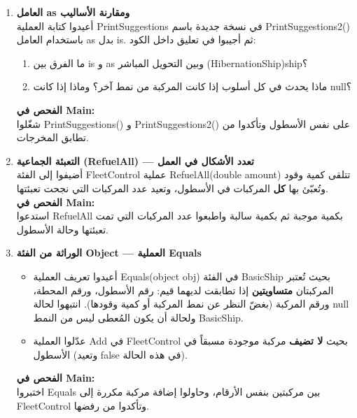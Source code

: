 \documentclass[14pt]{extarticle}
\begin{document}
\begin{enumerate}[resume, label=\textbf{تمرين \arabic*:}, wide=0pt, leftmargin=*, itemsep=2.2em]
    \item \textbf{العامل \textenglish{as} ومقارنة الأساليب} \\
    أعيدوا كتابة العملية \textenglish{PrintSuggestions} في نسخة جديدة باسم \textenglish{PrintSuggestions2()} باستخدام العامل \textenglish{as} بدل \textenglish{is}. ثم أجيبوا في تعليق داخل الكود:
    \begin{enumerate}[label=\textbf{\arabic*.}]
        \item ما الفرق بين \textenglish{is} و \textenglish{as} وبين التحويل المباشر \textenglish{(HibernationShip)ship}؟
        \item ماذا يحدث في كل أسلوب إذا كانت المركبة من نمط آخر؟ وماذا إذا كانت \textenglish{null}؟
    \end{enumerate}
    \textbf{الفحص في \textenglish{Main}:} \\
    شغّلوا \textenglish{PrintSuggestions()} و \textenglish{PrintSuggestions2()} على نفس الأسطول وتأكدوا من تطابق المخرجات.

    \item \textbf{التعبئة الجماعية (\textenglish{RefuelAll}) — تعدد الأشكال في العمل} \\
    أضيفوا إلى الفئة \textenglish{FleetControl} عملية \textenglish{RefuelAll(double amount)} تتلقى كمية وقود وتُعبّئ بها \textbf{كل} المركبات في الأسطول، وتعيد عدد المركبات التي نجحت تعبئتها. \\
    \textbf{الفحص في \textenglish{Main}:} \\
    استدعوا \textenglish{RefuelAll} بكمية موجبة ثم بكمية سالبة واطبعوا عدد المركبات التي تمت تعبئتها وحالة الأسطول.

    \item \textbf{الوراثة من الفئة \textenglish{Object} — العملية \textenglish{Equals}}
    \begin{itemize}
        \item أعيدوا تعريف العملية \textenglish{Equals(object obj)} في الفئة \textenglish{BasicShip} بحيث تُعتبر المركبتان \textbf{متساويتين} إذا تطابقت لديهما قيم: رقم الأسطول، ورقم المحطة، ورقم المركبة (بغضّ النظر عن نمط المركبة أو كمية وقودها). انتبهوا لحالة \textenglish{null} ولحالة أن يكون المُعطى ليس من النمط \textenglish{BasicShip}.
        \item عدّلوا العملية \textenglish{Add} في \textenglish{FleetControl} بحيث \textbf{لا تضيف} مركبة موجودة مسبقاً في الأسطول (وتعيد \textenglish{false} في هذه الحالة).
    \end{itemize}
    \textbf{الفحص في \textenglish{Main}:} \\
    اختبروا \textenglish{Equals} بين مركبتين بنفس الأرقام، وحاولوا إضافة مركبة مكررة إلى \textenglish{FleetControl} وتأكدوا من رفضها.

\end{enumerate}
\end{document}
